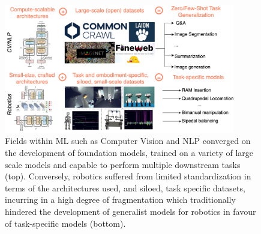 \begin{figure}
    \centering
    \includegraphics[width=0.9\textwidth]{figures/ch5/ch5-ml-vs-robotics-foundation.pdf}
    \caption{Fields within ML such as Computer Vision and NLP converged on the development of foundation models, trained on a variety of large scale models and capable to perform multiple downstream tasks (top). Conversely, robotics suffered from limited standardization in terms of the architectures used, and siloed, task specific datasets, incurring in a high degree of fragmentation which traditionally hindered the development of generalist models for robotics in favour of task-specific models (bottom).}
    \label{fig:ch5-ml-vs-robotics-foundation}
\end{figure}

